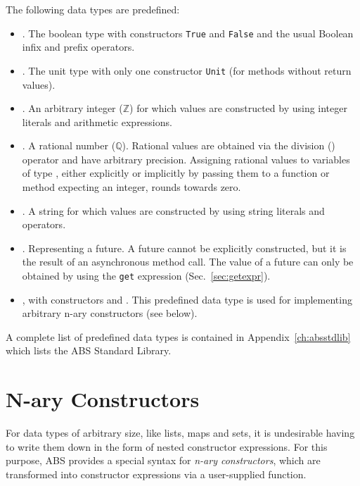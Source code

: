 The following data types are predefined:
\begin{itemize}
\item {}. The boolean type with constructors \texttt{True} and \texttt{False} and the usual Boolean infix and prefix operators.
\item {}. The unit type with only one constructor \texttt{Unit} (for methods without return values).
\item {}. An arbitrary integer ($\mathbb{Z}$) for which values are constructed by using integer literals and arithmetic expressions.
\item {}. A rational number ($\mathbb{Q}$).  Rational values are obtained via the division (\absinline{/}) operator and have arbitrary precision.  Assigning rational values to variables of type , either explicitly or implicitly by passing them to a function or method expecting an integer, rounds towards zero.
\item {}. A string for which values are constructed by using string literals and operators.
\item {}. Representing a future. A future cannot be explicitly constructed, but it is the result of an asynchronous method call. The value of a future can only be obtained by using the \texttt{get} expression (Sec.~\ref{sec:getexpr}).
\item {}, with constructors  and
  .  This predefined data type is used
  for implementing arbitrary n-ary constructors (see below).
\end{itemize}

A complete list of predefined data types is contained in
Appendix~\ref{ch:absstdlib} which lists the ABS Standard Library.

\section{N-ary Constructors}
\label{sec:n-ary-constructors}

For data types of arbitrary size, like lists, maps and sets, it is
undesirable having to write them down in the form of nested constructor
expressions.  For this purpose, ABS provides a special syntax for
\emph{n-ary constructors}, which are transformed into constructor
expressions via a user-supplied function.

